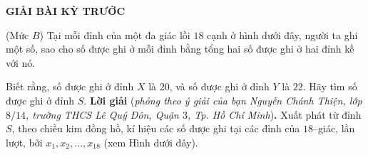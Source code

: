 \centerline{{\large{\textbf{\color{thachthuctoanhoc}GIẢI BÀI KỲ TRƯỚC}}}}
\vspace*{-5pt}
\begin{multicols}{2}
	\setlength{\abovedisplayskip}{4pt}
	\setlength{\belowdisplayskip}{4pt}
	{}
	(Mức $B$)
	Tại mỗi đỉnh của một đa giác lồi $18$ cạnh ở hình dưới đây, người ta ghi một số, sao cho số được ghi ở mỗi đỉnh bằng tổng hai số được ghi ở hai đỉnh kề với nó.
	
	
	Biết rằng, số được ghi ở đỉnh $X$ là $20$, và số được ghi ở đỉnh $Y$ là $22$. Hãy tìm số được ghi ở đỉnh $S$.
	\vskip 0.05cm
	\textbf{\color{thachthuctoanhoc}Lời giải} (\textit{phỏng theo ý giải của bạn Nguyễn Chánh Thiện, lớp $8/14$, trường THCS Lê Quý Đôn, Quận $3$, Tp. Hồ Chí Minh})\textbf{\color{thachthuctoanhoc}.}
	\vskip 0.05cm
	Xuất phát từ đỉnh $S$, theo chiều kim đồng hồ, kí hiệu các số được ghi tại các đỉnh của $18$--giác, lần lượt, bởi  $x_1,  x_2, \ldots, x_{18}$ (xem Hình dưới đây).
	

\end{multicols}
